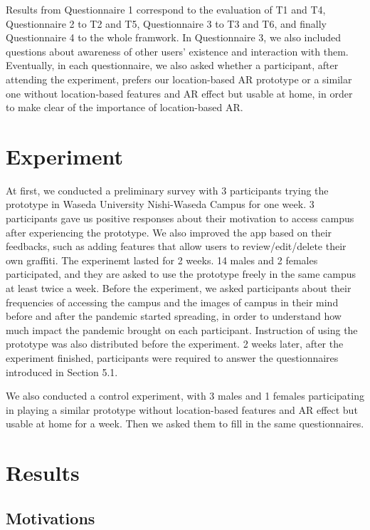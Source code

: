 Results from Questionnaire 1 correspond to the evaluation of T1 and T4, Questionnaire 2 to T2 and T5, Questionnaire 3 to T3 and T6, and finally Questionnaire 4 to the whole framwork.
In Questionnaire 3, we also included questions about awareness of other users' existence and interaction with them.
Eventually, in each questionnaire, we also asked whether a participant, after attending the experiment, prefers our location-based AR prototype or a similar one without location-based features and AR effect but usable at home,
in order to make clear of the importance of location-based AR.

\section{Experiment}

At first, we conducted a preliminary survey with 3 participants trying the prototype in Waseda University Nishi-Waseda Campus for one week.
3 participants gave us positive responses about their motivation to access campus after experiencing the prototype.
We also improved the app based on their feedbacks, such as adding features that allow users to review/edit/delete their own graffiti.
The experinemt lasted for 2 weeks. 14 males and 2 females participated,
and they are asked to use the prototype freely in the same campus at least twice a week.
Before the experiment, we asked participants about their frequencies of accessing the campus and the images of campus in their mind before and after the pandemic started spreading,
in order to understand how much impact the pandemic brought on each participant.
Instruction of using the prototype was also distributed before the experiment.
2 weeks later, after the experiment finished, participants were required to answer the questionnaires introduced in Section 5.1.

We also conducted a control experiment, with 3 males and 1 females participating in playing a similar prototype without location-based features and AR effect but usable at home for a week.
Then we asked them to fill in the same questionnaires.

\section{Results}
\subsection{Motivations}

